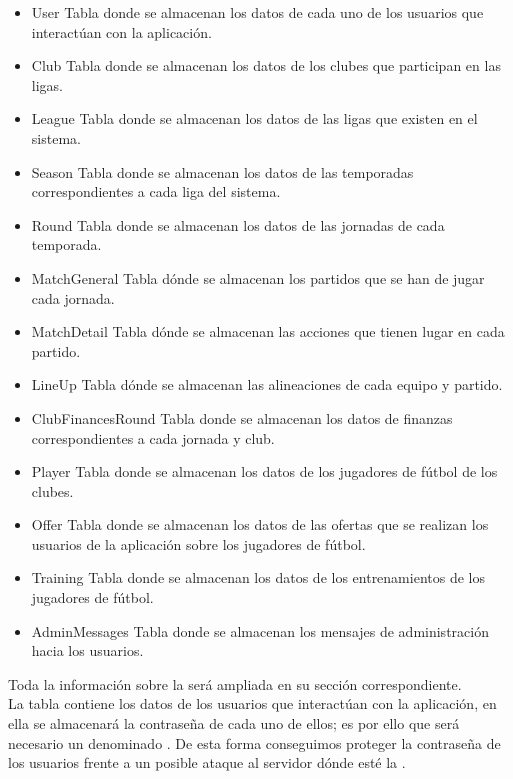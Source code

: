 \begin{itemize}
\item User Tabla donde se almacenan los datos de cada uno de los usuarios que
  interactúan con la aplicación.
\item Club Tabla donde se almacenan los datos de los clubes que participan en
  las ligas.
\item League Tabla donde se almacenan los datos de las ligas que existen en el
  sistema.
\item Season Tabla donde se almacenan los datos de las temporadas
  correspondientes a cada liga del sistema.
\item Round Tabla donde se almacenan los datos de las jornadas de cada
  temporada.
\item MatchGeneral Tabla dónde se almacenan los partidos que se han de jugar
  cada jornada.
\item MatchDetail Tabla dónde se almacenan las acciones que tienen lugar en cada
  partido.
\item LineUp Tabla dónde se almacenan las alineaciones de cada equipo y partido.
\item ClubFinancesRound Tabla donde se almacenan los datos de finanzas
  correspondientes a cada jornada y club.
\item Player Tabla donde se almacenan los datos de los jugadores de fútbol de
  los clubes.
\item Offer Tabla donde se almacenan los datos de las ofertas que se realizan
  los usuarios de la aplicación sobre los jugadores de fútbol.
\item Training Tabla donde se almacenan los datos de los entrenamientos de los
  jugadores de fútbol.
\item AdminMessages Tabla donde se almacenan los mensajes de administración
  hacia los usuarios.
\end{itemize}

Toda la información sobre la  será ampliada en
su sección correspondiente.\\

La tabla  contiene los datos de los usuarios que interactúan con
la aplicación, en ella se almacenará la contraseña de cada uno de ellos; es por
ello que será necesario un  denominado
. De esta forma conseguimos proteger la contraseña de los usuarios
frente a un
posible ataque al servidor dónde esté la .\\

